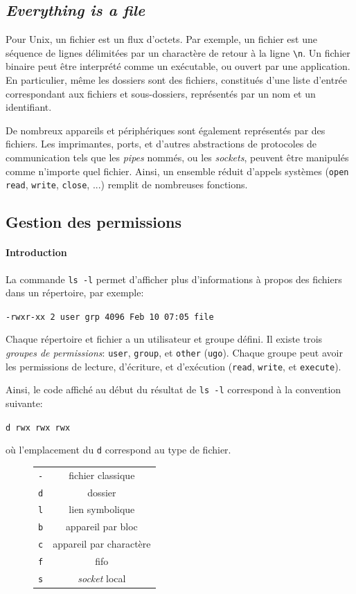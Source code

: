 \documentclass[french, toc]{../cs-classes/cs-classes}
\begin{document}
\subsection{\emph{Everything is a file}}
Pour Unix, un fichier est un flux d'octets. Par exemple, un fichier est une séquence de lignes délimitées par un charactère de retour à la ligne \texttt{\textbackslash n}. Un fichier binaire peut être interprété comme un exécutable, ou ouvert par une application. En particulier, même les dossiers sont des fichiers, constitués d'une liste d'entrée correspondant aux fichiers et sous-dossiers, représentés par un nom et un identifiant.

De nombreux appareils et périphériques sont également représentés par des fichiers. Les imprimantes, ports, et d'autres abstractions de protocoles de communication tels que les \emph{pipes} nommés, ou les \emph{sockets}, peuvent être manipulés comme n'importe quel fichier. Ainsi, un ensemble réduit d'appels systèmes (\texttt{open} \texttt{read}, \texttt{write}, \texttt{close}, ...) remplit de nombreuses fonctions.

\subsection{Gestion des permissions}
\paragraph*{Introduction} La commande \texttt{ls -l} permet d'afficher plus d'informations à propos des fichiers dans un répertoire, par exemple:
\begin{center}
    \texttt{-rwxr-xx \phantom{   } 2 user grp 4096 Feb 10 07:05 file}
\end{center}
Chaque répertoire et fichier a un utilisateur et groupe défini. Il existe trois \emph{groupes de permissions}: \texttt{user}, \texttt{group}, et \texttt{other} (\texttt{ugo}). Chaque groupe peut avoir les permissions de lecture, d'écriture, et d'exécution (\texttt{read}, \texttt{write}, et \texttt{execute}).

Ainsi, le code affiché au début du résultat de \texttt{ls -l} correspond à la convention suivante:
\begin{center}
    \texttt{d rwx rwx rwx}
\end{center}
où l'emplacement du \texttt{d} correspond au type de fichier.

\begin{figure}[!ht]
    \centering
    \begin{tabular}{c c}
        \texttt{-} & fichier classique \\
        \texttt{d} & dossier \\
        \texttt{l} & lien symbolique \\
        \texttt{b} & appareil par bloc \\
        \texttt{c} & appareil par charactère \\
        \texttt{f} & fifo \\
        \texttt{s} & \emph{socket} local \\
    \end{tabular}
\end{figure}
\end{document}
